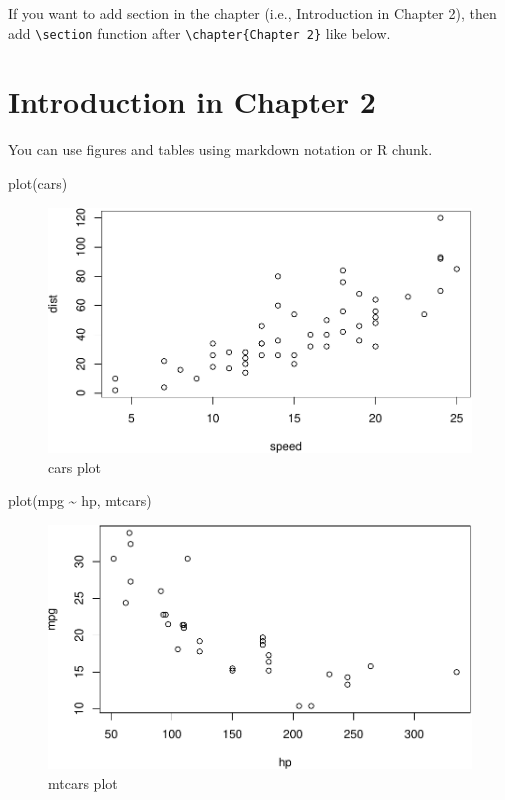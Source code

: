 \documentclass[12pt, a4paper]{report} %
\newenvironment{Shaded}{\begin{snugshade}}{\end{snugshade}}
\newcommand{\FunctionTok}[1]{\textcolor[rgb]{0.00,0.00,0.00}{#1}}
\newcommand{\NormalTok}[1]{#1}
\newcommand{\SpecialCharTok}[1]{\textcolor[rgb]{0.00,0.00,0.00}{#1}}
\begin{document}
If you want to add section in the chapter (i.e., Introduction in Chapter
2), then add \texttt{\textbackslash{}section} function after
\texttt{\textbackslash{}chapter\{Chapter\ 2\}} like below.

\section{Introduction in Chapter 2}

You can use figures and tables using markdown notation or R chunk.

\begin{Shaded}
\begin{Highlighting}[]
\FunctionTok{plot}\NormalTok{(cars)}
\end{Highlighting}
\end{Shaded}

\begin{figure}
\centering
\includegraphics{skeleton_files/figure-latex/cars-1.pdf}
\caption{cars plot}
\end{figure}

\begin{Shaded}
\begin{Highlighting}[]
\FunctionTok{plot}\NormalTok{(mpg }\SpecialCharTok{\textasciitilde{}}\NormalTok{ hp, mtcars)}
\end{Highlighting}
\end{Shaded}

\begin{figure}
\centering
\includegraphics{skeleton_files/figure-latex/mtcars-1.pdf}
\caption{mtcars plot}
\end{figure}
\end{document}
